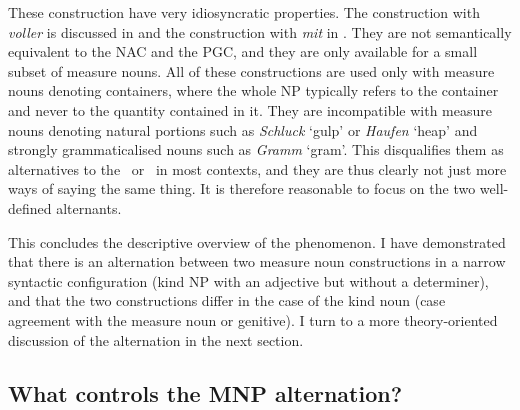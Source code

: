 \begin{exe}
  \ex\label{ex:alternatives}
  \begin{xlist}
  \end{xlist}
\end{exe}

These construction have very idiosyncratic properties.
The construction with \textit{voller} is discussed in \cite{Zeldes2018} and the construction with \textit{mit} in \cite{Bhatt1990}.
They are not semantically equivalent to the NAC and the PGC, and they are only available for a small subset of measure nouns.
All of these constructions are used only with measure nouns denoting containers, where the whole NP typically refers to the container and never to the quantity contained in it.
They are incompatible with measure nouns denoting natural portions such as \textit{Schluck} `gulp' or \textit{Haufen} `heap' and strongly grammaticalised nouns such as \textit{Gramm} `gram'.
This disqualifies them as alternatives to the \NACa\ or \PGCa\ in most contexts, and they are thus clearly not just more ways of saying the same thing. 
It is therefore reasonable to focus on the two well-defined alternants.

This concludes the descriptive overview of the phenomenon.
I have demonstrated that there is an alternation between two measure noun constructions in a narrow syntactic configuration (kind NP with an adjective but without a determiner), and that the two constructions differ in the case of the kind noun (case agreement with the measure noun or genitive).
I turn to a more theory-oriented discussion of the alternation in the next section.


\subsection{What controls the MNP alternation?}
\label{sec:analyses}

